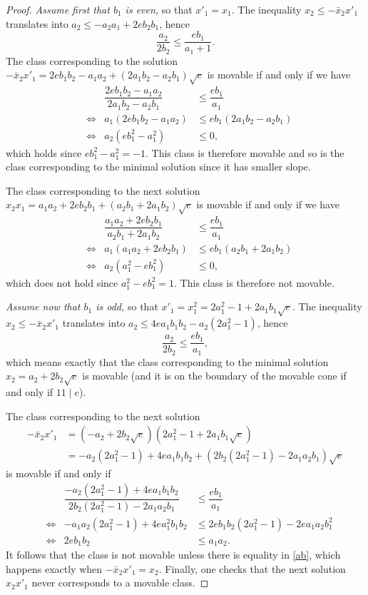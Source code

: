 \documentclass[JEP,XML,SOM,Unicode, NoEqCountersInSection,NoFloatCountersInSection]{cedram}
\theoremstyle{definition}
\begin{document}
\begin{proof}
\emph{Assume first that $b_1$ is even,} so that $x'_1=x_1$. The inequality $x_2\le -\bar x_2x'_1 $ translates into $a_2\le -a_2a_1+2eb_2b_1$, hence
\begin{equation}\label{slope}
\frac{a_2}{2b_2}\le \frac{eb_1}{a_1+1}.
\end{equation}
The class corresponding to the solution $-\bar x_2x'_1=
2eb_1b_2 -a_1a_2 +(2a_1b_2-a_2b_1) \sqrt{e}$
is movable if and only if we have
\[
\begin{aligned}
&& \dfrac{2eb_1b_2-a_1a_2}{2a_1b_2-a_2b_1}&\le \dfrac{eb_1}{a_1}\\
&\iff& a_1(2eb_1b_2-a_1a_2)&\le eb_1(2a_1b_2-a_2b_1)\\
&\iff& a_2(eb_1^2-a_1^2)&\le 0,
\end{aligned}
\]
which holds since
$eb_1^2-a_1^2=-1$. This class is therefore movable and so is the class corresponding to the minimal solution since it has smaller slope.

The class corresponding to the next solution $x_2x_1=
a_1a_2+2eb_2b_1 +(a_2b_1+2a_1b_2) \sqrt{e}$ is movable if and only if we have
\[
\begin{aligned}
&& \dfrac{a_1a_2+2eb_2b_1}{a_2b_1+2a_1b_2}&\le \dfrac{eb_1}{a_1}\\
&\iff& a_1(a_1a_2+2eb_2b_1)&\le eb_1(a_2b_1+2a_1b_2)\\
&\iff& a_2(a_1^2-eb_1^2)&\le 0,
\end{aligned}
\]
which does not hold since $a_1^2-eb_1^2 =1$. This class is therefore not movable.

\emph{Assume now that $b_1$ is odd,} so that $x'_1=x_1^2=2a_1^2-1+2a_1b_1\sqrt{e}$. The inequality $x_2\le -\bar x_2x'_1 $ translates into $a_2\le 4ea_1b_1b_2-a_2(2a_1^2-1)$, hence
\begin{equation}\label{ab}
\frac{a_2}{2b_2}\le \dfrac{eb_1}{a_1},
\end{equation}
which means exactly that the class corresponding to the minimal solution $ x_2=a_2 +2b_2 \sqrt{e}$
is movable (and it is on the boundary of the movable cone if and only if $11\mid e$).

The class corresponding to the next solution
\begin{align*}
-\bar x_2x'_1&=
(-a_2 +2b_2 \sqrt{e})(2a_1^2-1+2a_1b_1\sqrt{e})
\\&
=-a_2(2a_1^2-1)+4ea_1b_1b_2+(2b_2(2a_1^2-1)-2a_1a_2b_1)\sqrt{e}
\end{align*}
is movable if and only if
\[
\begin{aligned}
&& \dfrac{-a_2(2a_1^2-1)+4ea_1b_1b_2}{2b_2(2a_1^2-1)-2a_1a_2b_1}&\le \dfrac{eb_1}{a_1}\\
&\iff& -a_1a_2(2a_1^2-1)+4ea_1^2b_1b_2&\le 2eb_1b_2(2a_1^2-1)-2ea_1a_2b_1^2\\
&\iff&2eb_1b_2 &\le a_1a_2.
\end{aligned}
\]
It follows that the class is not movable unless there is equality in \eqref{ab}, which happens exactly when
$-\bar x_2x'_1=x_2$. Finally, one checks that the next solution $ x_2x'_1$ never corresponds to a movable class.
\end{proof}
\end{document}
